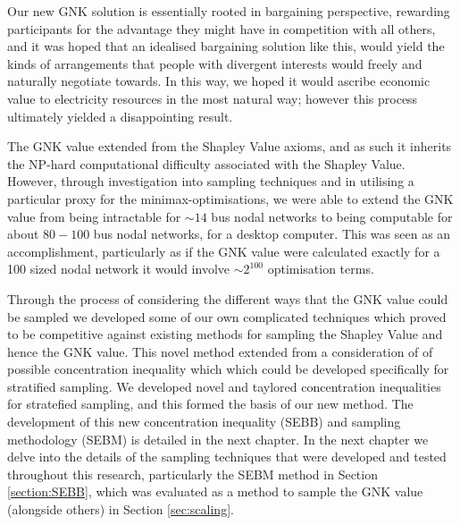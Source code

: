 Our new GNK solution is essentially rooted in bargaining perspective, rewarding participants for the advantage they might have in competition with all others, 
and it was hoped that an idealised bargaining solution like this, would yield the kinds of arrangements that people with divergent interests would freely and naturally negotiate towards.
In this way, we hoped it would ascribe economic value to electricity resources in the most natural way; however this process ultimately yielded a disappointing result.


The GNK value extended from the Shapley Value axioms, and as such it inherits the NP-hard computational difficulty associated with the Shapley Value.
However, through investigation into sampling techniques and in utilising a particular proxy for the minimax-optimisations, we were able to extend the GNK value from being intractable for $\sim 14$ bus nodal networks to being computable for about $80-100$ bus nodal networks, for a desktop computer.
This was seen as an accomplishment, particularly as if the GNK value were calculated exactly for a 100 sized nodal network it would involve $\sim 2^{100}$ optimisation terms.

Through the process of considering the different ways that the GNK value could be sampled we developed some of our own complicated techniques which proved to be competitive against existing methods for sampling the Shapley Value and hence the GNK value.
This novel method extended from a consideration of of possible concentration inequality which which could be developed specifically for stratified sampling.
We developed novel and taylored concentration inequalities for stratefied sampling, and this formed the basis of our new method.
The development of this new concentration inequality (SEBB) and sampling methodology (SEBM) is detailed in the next chapter.
In the next chapter we delve into the details of the sampling techniques that were developed and tested throughout this research, particularly the \textsc{SEBM} method in Section \ref{section:SEBB}, which was evaluated as a method to sample the GNK value (alongside others) in Section \ref{sec:scaling}.








